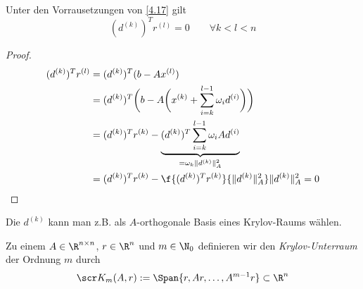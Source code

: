 \documentclass[11pt]{scrbook}
\begin{document}
\begin{lem}[Orthogonalität] \label{4.18}
	Unter den Vorrausetzungen von \ref{4.17} gilt
	\[
		(d^{(k)})^T r^{(l)} = 0
		\qquad \forall k < l < n
	\]
	\begin{proof}
		\begin{align*}
			(d^{(k)})^T r^{(l)}
			&= (d^{(k)})^T (b-Ax^{(l)}) \\
			&= (d^{(k)})^T \bigg( b - A \bigg(x^{(k)} + \sum_{i=k}^{l-1} \omega_i d^{(i)} \bigg) \bigg) \\
			&= (d^{(k)})^T r^{(k)} - \underbrace{(d^{(k)})^T \sum_{i=k}^{l-1} \omega_i A d^{(i)}}_{= \omega_k \|d^{(k)}\|_A^2} \\
			&= (d^{(k)})^T r^{(k)} - \f{(d^{(k)})^T r^{(k)}}{\|d^{(k)}\|_A^2} \|d^{(k)}\|_A^2 = 0
		\end{align*}
	\end{proof}
\end{lem}

Die $d^{(k)}$ kann man z.B. als $A$-orthogonale Basis eines Krylov-Raums wählen.

\begin{df} \label{4.19}
	Zu einem $A \in \R^{n\times n}$, $r\in \R^n$ und $m\in \N_0$ definieren wir den \emph{Krylov-Unterraum} der Ordnung $m$  durch
	\[
		\scr K_m(A, r) := \Span\{ r, Ar, \dotsc, A^{m-1}r \} \subset \R^n
	\]
\end{df}
\end{document}
